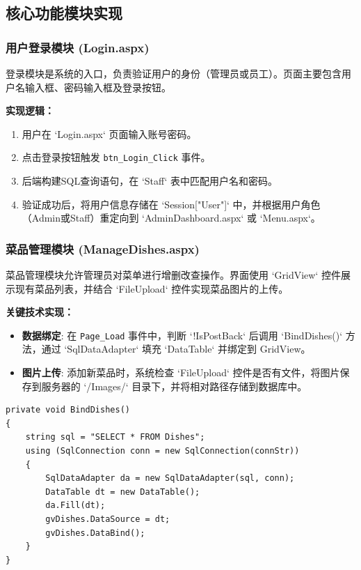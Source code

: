 \documentclass[11pt, a4paper]{article}
\begin{document}
\subsection{核心功能模块实现}

\subsubsection{用户登录模块 (Login.aspx)}
登录模块是系统的入口，负责验证用户的身份（管理员或员工）。页面主要包含用户名输入框、密码输入框及登录按钮。

\textbf{实现逻辑：}
\begin{enumerate}
    \item 用户在 `Login.aspx` 页面输入账号密码。
    \item 点击登录按钮触发 \texttt{btn\_Login\_Click} 事件。
    \item 后端构建SQL查询语句，在 `Staff` 表中匹配用户名和密码。
    \item 验证成功后，将用户信息存储在 `Session["User"]` 中，并根据用户角色（Admin或Staff）重定向到 `AdminDashboard.aspx` 或 `Menu.aspx`。
\end{enumerate}

\subsubsection{菜品管理模块 (ManageDishes.aspx)}
菜品管理模块允许管理员对菜单进行增删改查操作。界面使用 `GridView` 控件展示现有菜品列表，并结合 `FileUpload` 控件实现菜品图片的上传。

\textbf{关键技术实现：}
\begin{itemize}
    \item \textbf{数据绑定}: 在 \texttt{Page\_Load} 事件中，判断 `!IsPostBack` 后调用 `BindDishes()` 方法，通过 `SqlDataAdapter` 填充 `DataTable` 并绑定到 GridView。
    \item \textbf{图片上传}: 添加新菜品时，系统检查 `FileUpload` 控件是否有文件，将图片保存到服务器的 `/Images/` 目录下，并将相对路径存储到数据库中。
\end{itemize}

\begin{lstlisting}[language={[Sharp]C}, caption={菜品数据绑定逻辑}, label={code:binddish}]
private void BindDishes()
{
    string sql = "SELECT * FROM Dishes";
    using (SqlConnection conn = new SqlConnection(connStr))
    {
        SqlDataAdapter da = new SqlDataAdapter(sql, conn);
        DataTable dt = new DataTable();
        da.Fill(dt);
        gvDishes.DataSource = dt;
        gvDishes.DataBind();
    }
}
\end{lstlisting}
\end{document}
